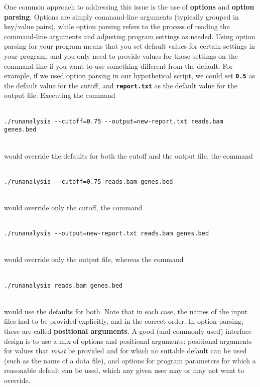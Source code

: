 \documentclass{article}
\begin{document}
One common approach to addressing this issue is the use of \textbf{options} and \textbf{option parsing}. Options are simply command-line arguments (typically grouped in key/value pairs), while option parsing refers to the process of reading the command-line arguments and adjusting program settings as needed. Using option parsing for your program means that you set default values for certain settings in your program, and you only need to provide values for those settings on the command line if you want to use something different from the default. For example, if we used option parsing in our hypothetical script, we could set \texttt{\textbf{0.5}} as the default value for the cutoff, and \texttt{\textbf{report.txt}} as the default value for the output file. Executing the command
\\ \\
\begin{verbatim}
./runanalysis --cutoff=0.75 --output=new-report.txt reads.bam genes.bed
\end{verbatim}
\\
would override the defaults for both the cutoff and the output file, the command
\\ \\
\begin{verbatim}
./runanalysis --cutoff=0.75 reads.bam genes.bed
\end{verbatim}
\\
would override only the cutoff, the command
\\ \\
\begin{verbatim}
./runanalysis --output=new-report.txt reads.bam genes.bed
\end{verbatim}
\\
would override only the output file, whereas the command
\\ \\
\begin{verbatim}
./runanalysis reads.bam genes.bed
\end{verbatim}
\\
would use the defaults for both. Note that in each case, the names of the input files had to be provided explicitly, and in the correct order. In option parsing, these are called \textbf{positional arguments}. A good (and commonly used) interface design is to use a mix of options and positional arguments: positional arguments for values that \textit{must} be provided and for which no suitable default can be used (such as the name of a data file), and options for program parameters for which a reasonable default can be used, which any given user may or may not want to override.
\end{document}
